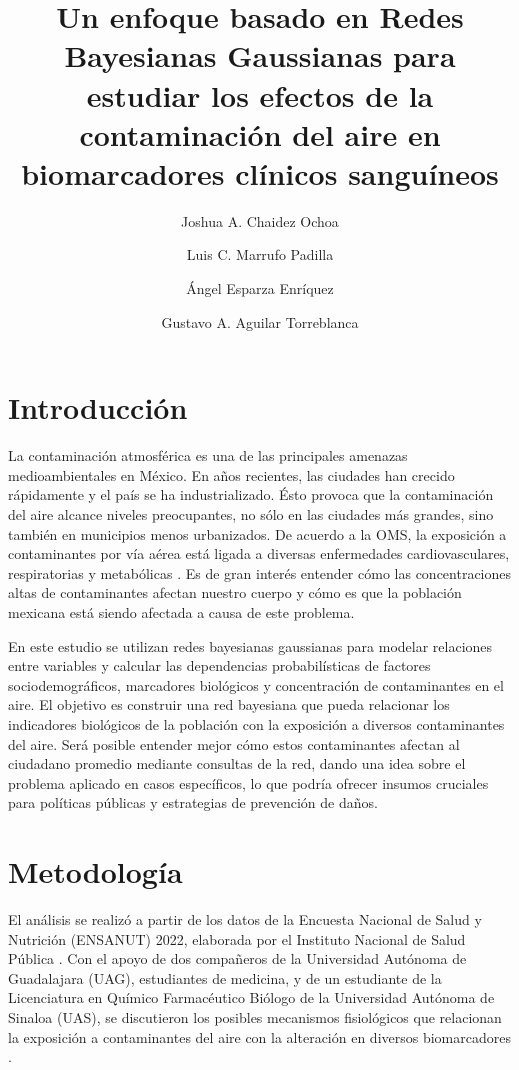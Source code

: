 \documentclass[eng]{ajceam-class}
\title {Un enfoque basado en Redes Bayesianas Gaussianas para estudiar los efectos de la contaminación del aire en biomarcadores clínicos sanguíneos}
\author[1]{Joshua A. Chaidez Ochoa}
\author[1]{Luis C. Marrufo Padilla}
\author[1]{Ángel Esparza Enríquez}
\author[1]{Gustavo A. Aguilar Torreblanca}
\affil[1]{Tecnológico de Monterrey, Escuela de Ingeniería y Ciencias, Guadalajara, Jalisco}
\begin{document}
\maketitle
\thispagestyle{fancy}

\section{Introducción}

 La contaminación atmosférica es una de las principales amenazas medioambientales en México. En años recientes, las ciudades han crecido rápidamente y el país se ha industrializado. Ésto provoca que la contaminación del aire alcance niveles preocupantes, no sólo en las ciudades más grandes, sino también en municipios menos urbanizados. De acuerdo a la OMS, la exposición a contaminantes por vía aérea está ligada a diversas enfermedades cardiovasculares, respiratorias y metabólicas \cite{who2024airquality}. Es de gran interés entender cómo las concentraciones altas de contaminantes afectan nuestro cuerpo y cómo es que la población mexicana está siendo afectada a causa de este problema.

En este estudio se utilizan redes bayesianas gaussianas para modelar relaciones entre variables y calcular las dependencias probabilísticas de factores sociodemográficos, marcadores biológicos y concentración de contaminantes en el aire. El objetivo es construir una red bayesiana que pueda relacionar los indicadores biológicos de la población con la exposición a diversos contaminantes del aire. Será posible entender mejor cómo estos contaminantes afectan al ciudadano promedio  mediante consultas de la red, dando una idea sobre el problema aplicado en casos específicos, lo que podría ofrecer insumos cruciales para políticas públicas y estrategias de prevención de daños.


\section{Metodología}

El análisis se realizó a partir de los datos de la Encuesta Nacional de Salud y Nutrición (ENSANUT) 2022, elaborada por el Instituto Nacional de Salud Pública \cite{ensanut2025}. Con el apoyo de dos compañeros de la Universidad Autónoma de Guadalajara (UAG), estudiantes de medicina, y de un estudiante de la Licenciatura en Químico Farmacéutico Biólogo de la Universidad Autónoma de Sinaloa (UAS), se discutieron los posibles mecanismos fisiológicos que relacionan la exposición a contaminantes del aire con la alteración en diversos biomarcadores \cite{jameson2018harrison} \cite{ross2020histologia}.
\end{document}

